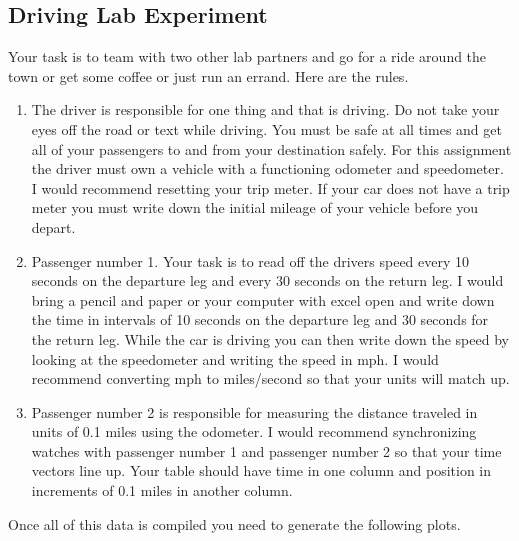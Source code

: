 \subsection{Driving Lab Experiment}

Your task is to team with two other lab partners and go for a ride
around the town or get some coffee or just run an errand. Here are the rules.

\begin{enumerate}

\item The driver is responsible for one thing and that is driving. Do
  not take your eyes off the road or text while driving. You must be
  safe at all times and get all of your passengers to and from your
  destination safely. For this assignment the driver must own a
  vehicle with a functioning odometer and speedometer.  I would
  recommend resetting your trip meter. If your car does not have a
  trip meter you must write down the initial mileage of your vehicle
  before you depart. 

\item Passenger number 1. Your task is to read off the drivers speed
  every 10 seconds on the departure leg and every 30 seconds on the
  return leg. I would bring a pencil and paper or your computer with
  excel open and write down the time in intervals of 10 seconds on the
  departure leg and 30 seconds for the return leg. While the car is
  driving you can then write down the speed by looking at the
  speedometer and writing the speed in mph. I would recommend
  converting mph to miles/second so that your units will match up. 

\item Passenger number 2 is responsible for measuring the distance
  traveled in units of 0.1 miles using the odometer. I would recommend
  synchronizing watches with passenger number 1 and passenger number 2
  so that your time vectors line up. Your table should have time in
  one column and position in increments of 0.1 miles in another
  column.

\end{enumerate}

Once all of this data is compiled you need to generate the following plots.

